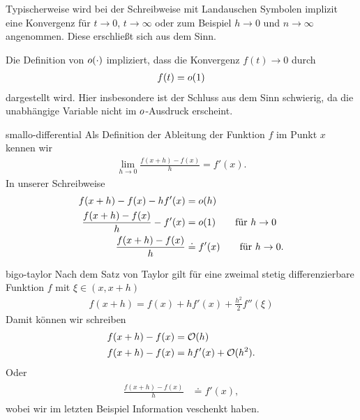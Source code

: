 \begin{remark}
  Typischerweise wird bei der Schreibweise mit Landauschen Symbolen
  implizit eine Konvergenz für $t\to 0$, $t\to\infty$ oder zum
  Beispiel $h\to 0$ und $n\to\infty$ angenommen. Diese erschließt sich
  aus dem Sinn.
  
  Die Definition von $o(\cdot)$ impliziert, dass die Konvergenz
  $f(t)\to 0$ durch
  \begin{gather}
    f(t) = o(1)
  \end{gather}
  dargestellt wird. Hier insbesondere ist der Schluss aus dem Sinn
  schwierig, da die unabhängige Variable nicht im $o$-Ausdruck
  erscheint.
\end{remark}

\begin{Beispiel}{smallo-differential}
  Als Definition der Ableitung der Funktion $f$ im Punkt $x$ kennen wir
  \begin{gather}
    \lim\limits_{h\to 0}\frac{f(x+h)-f(x)}{h} = f'(x).
  \end{gather}
  In unserer Schreibweise
  \begin{gather}
    \begin{split}
      f(x+h)-f(x) - h f'(x) &= o(h)\\
      \frac{f(x+h)-f(x)}{h} - f'(x) &= o(1)
      \qquad\text{für } h\to 0\\
      \frac{f(x+h)-f(x)}{h}  &\doteq f'(x)
      \qquad\text{für } h\to 0.
    \end{split}
  \end{gather}
\end{Beispiel}

\begin{Beispiel}{bigo-taylor}
  Nach dem Satz von Taylor gilt für eine zweimal stetig
  differenzierbare Funktion $f$ mit $\xi\in(x,x+h)$
  \begin{gather}
 f(x+h) = f(x) + h f'(x) + \tfrac{h^2}{2} f''(\xi)   
\end{gather}
Damit können wir schreiben
\begin{gather}
  \begin{split}
    f(x+h)-f(x) &= \mathcal O(h)\\
    f(x+h)-f(x) &=  h f'(x) + \mathcal O(h^2).
  \end{split}
\end{gather}
Oder
\begin{gather}
  \begin{split}
    \frac{f(x+h)-f(x)}h &\doteq f'(x),
  \end{split}
\end{gather}
wobei wir im letzten Beispiel Information veschenkt haben.
\end{Beispiel}

